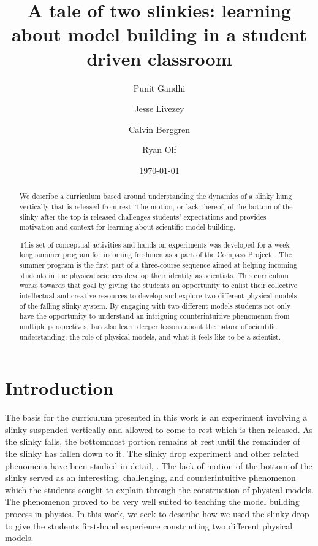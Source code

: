 \documentclass[aps,pre,10pt,superscriptaddress,showpacs,amsmath,amssymb,nofootinbib]{revtex4-1}
\begin{document}
\title{A tale of two slinkies: learning about model building in a student driven classroom }
\author{Punit  Gandhi}
\author{Jesse Livezey}
\author{Calvin Berggren}
\author{Ryan Olf}
\date{\today}

\begin{abstract}

We describe a curriculum based around understanding the dynamics of a slinky hung vertically that is released from rest.
The motion, or lack thereof, of the bottom of the slinky after the top is released challenges students' expectations and provides motivation and context for learning about scientific model building.

This set of conceptual activities and hands-on experiments was developed for a week-long summer program for incoming freshmen as a part of the Compass Project~\cite{albana2013}.  
The summer program is the first part of a three-course sequence aimed at helping incoming students in the physical sciences develop their identity as scientists.  
This curriculum works towards that goal by giving the students an opportunity to enlist their collective intellectual and creative resources to develop and explore two different physical models of the falling slinky system. By engaging with two different models students not only have the opportunity to understand an intriguing counterintuitive phenomenon from multiple perspectives, but also learn deeper lessons about the nature of scientific understanding, the role of physical models, and what it feels like to be a scientist.
\end{abstract}

\maketitle

\section{Introduction}

The basis for the curriculum presented in this work is an experiment involving a slinky
suspended vertically and allowed to come to rest which is then released. As the
slinky falls, the bottommost portion remains at rest until the remainder of the
slinky has fallen down to it.
The slinky drop experiment and other related phenomena have
been studied in detail, \cite{calkin1993, newburgh1995, graham2001, aguirregabiria2007,unruh2011, cross2012}.
The lack of motion of the bottom of the slinky
served as an interesting, challenging, and counterintuitive phenomenon which the students sought to explain through
the construction of physical models. The phenomenon proved to be very well suited to
teaching the model building process in physics. In this work,
we seek to describe how we used the slinky drop to give the students first-hand
experience constructing two different physical models.
\end{document}
